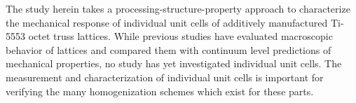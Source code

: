 The study herein takes a processing-structure-property approach to characterize the mechanical response of individual unit cells of additively manufactured Ti-5553 octet truss lattices. While previous studies have evaluated macroscopic behavior of lattices and compared them with continuum level predictions of mechanical properties, no study has yet investigated individual unit cells. The measurement and characterization of individual unit cells is important for verifying the many homogenization schemes which exist for these parts.
